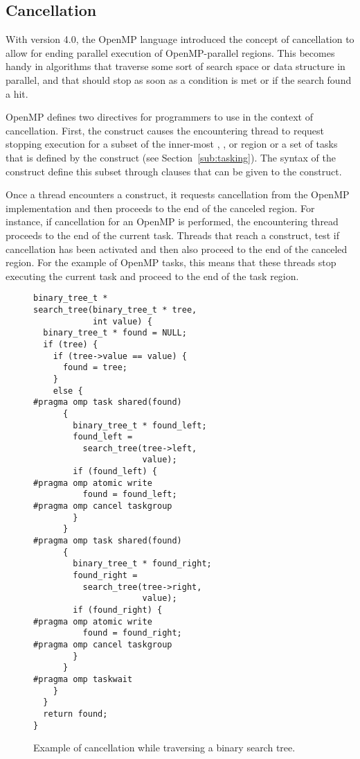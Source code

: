 \subsection{Cancellation}
\label{sec:Cancellation}
With version 4.0, the OpenMP language introduced the concept of cancellation to allow for ending parallel execution of OpenMP-parallel regions.
This becomes handy in algorithms that traverse some sort of search space or data structure in parallel, and that should stop as soon as a condition is met or if the search found a hit.

OpenMP defines two directives for programmers to use in the context of cancellation.
First, the  construct causes the encountering thread to request stopping execution for a subset of the inner-most , ,  or  region or a set of tasks that is defined by the  construct (see Section~\ref{sub:tasking}).  
The syntax of the  construct define this subset through clauses that can be given to the construct.

Once a thread encounters a  construct, it requests cancellation from the OpenMP implementation and then proceeds to the end of the canceled region.
For instance, if cancellation for an OpenMP  is performed, the encountering thread proceeds to the end of the current task.
Threads that reach a  construct, test if cancellation has been activated and then also proceed to the end of the canceled region.
For the example of OpenMP tasks, this means that these threads stop executing the current task and proceed to the end of the task region.

\begin{figure}
\begin{verbatim}
binary_tree_t *
search_tree(binary_tree_t * tree,
            int value) {
  binary_tree_t * found = NULL;
  if (tree) {
    if (tree->value == value) {
      found = tree;
    }
    else {
#pragma omp task shared(found)
      {
        binary_tree_t * found_left;
        found_left =
          search_tree(tree->left,
                      value);
        if (found_left) {
#pragma omp atomic write
          found = found_left;
#pragma omp cancel taskgroup
        }
      }
#pragma omp task shared(found)
      {
        binary_tree_t * found_right;
        found_right =
          search_tree(tree->right,
                      value);
        if (found_right) {
#pragma omp atomic write
          found = found_right;
#pragma omp cancel taskgroup
        }
      }
#pragma omp taskwait
    }
  }
  return found;
}
\end{verbatim}
\caption{Example of cancellation while traversing a binary search tree.\label{fig:Cancellation}}
\end{figure}

